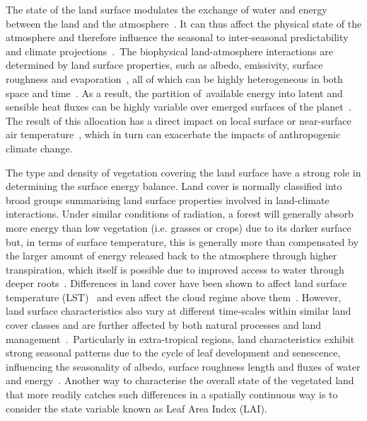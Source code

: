 \documentclass[gmd, manuscript]{copernicus}
\providecommand{\DIFaddbegin}{} %
\begin{document}


\introduction  %


The state of the land surface modulates the exchange of water and energy
between the land and the atmosphere~\citep{Seneviratne_2010}. It can thus
affect the physical state of the atmosphere and therefore influence the
seasonal to inter-seasonal predictability and climate
projections~\citep{Koster_2004}.~The biophysical land-atmosphere
interactions are determined by land surface properties, such as albedo,
emissivity, surface roughness and evaporation~\citep{anderson2012climate}, all of
which can be highly heterogeneous in both space and
time~\citep{santanello2018land}. As a result, the partition of~available energy
into latent and sensible heat fluxes can be highly variable over emerged
surfaces of the planet~\citep{dickinson1995land}. The result of this allocation
has a direct impact on local surface or near-surface air
temperature~\citep{pielke2002influence}, which in turn can exacerbate the impacts
of anthropogenic climate change.~

The type and density of vegetation covering the land surface have a
strong role in determining the surface energy balance. Land cover is
normally classified into broad groups summarising land surface
properties involved in land-climate interactions. Under similar
conditions of radiation, a forest will generally absorb more energy than
low vegetation (i.e. grasses or crops) due to its darker surface but, in
terms of surface temperature, this is generally more than compensated by
the larger amount of energy released back to the atmosphere through
higher transpiration, which itself is possible due to improved access to
water through deeper roots~\citep{Bonan2008}. Differences in land cover
have been shown to affect land surface temperature
(LST)~\citep{Duveiller_2018, Alkama2016, Li2015} and even affect the cloud regime above
them~\citep{Duveiller_2021, Xu2022}. However, land surface characteristics also vary
at different time-scales within similar land cover classes and are
further affected by both natural processes and land
management~\citep{anderson2011biophysical}.~Particularly in extra-tropical regions,
land characteristics exhibit strong seasonal patterns due to the cycle
of leaf development and senescence, influencing the seasonality of
albedo, surface roughness length and fluxes of water
and energy~\citep{RICHARDSON2013156}. Another way to characterise the overall
state of the vegetated land that more readily catches such differences
in a spatially continuous way is to consider the state variable known as
Leaf Area Index (LAI).
\DIFaddbegin 
\end{document}
